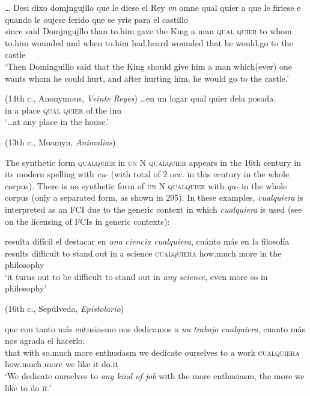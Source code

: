 \ea \label{ex:key:294}
\ea \label{ex:key:294-1} 
\gll … Desi dixo domjngujllo que le diese el Rey \textit{vn} {omne} {qual} {quier} a que le firiese e quando le oujese ferido que se yrie para el castillo\\
{} since said Domjngujllo than to.him gave the King a man \textsc{qual} \textsc{quier} to whom to.him wounded and when to.him had.heard wounded that he would.go to the castle\\
    \glt ‘Then Dominguillo said that the King should give him a man which(ever) one wants whom he could hurt, and after hurting him, he would go to the castle.’

    (14th c., Anonymous, \textit{Veinte Reyes})
\ex \label{ex:key:294-2} 
\gll …en un logar qual quier dela posada.\\
in a place \textsc{qual} \textsc{quier} of.the inn\\
    \glt ‘…at any place in the house.’

    (13th c., Moamyn, \textit{Animalias})
\z
\z

\largerpage
The synthetic form \textsc{qualquier} in \textsc{un} N \textsc{qualquier} appears in the 16th century in its modern spelling with \textit{cu}{}- (with total of 2 occ. in this century in the whole corpus). There is no synthetic form of \textsc{un} N \textsc{qualquier} with \textit{qu-} in the whole corpus (only a separated form, as shown in 295). In these examples, \textit{cualquiera} is interpreted as an FCI due to the generic context in which \textit{cualquiera} is used (see  on the licensing of FCIs in generic contexts):

\ea \label{ex:key:295} %
  \gll resulta difícil el destacar en \textit{una} \textit{ciencia} \textit{cualquiera}, cuánto más en la filosofía\\
results difficult to stand.out in a science \textsc{cualquiera} how.much more in the philosophy\\
  \glt ‘it turns out to be difficult to stand out in \textit{any science}, even more so in philosophy’

  (16th c., Sepúlveda, \textit{Epistolario})
\z 

\ea \label{ex:key:296} %
  \gll que con tanto más entusiasmo nos dedicamos a \textit{un} \textit{trabajo} \textit{cualquiera}, cuanto más nos agrada el hacerlo.\\
that with so.much more enthusiasm we {dedicate ourselves} to a work \textsc{cualquiera} how.much more we like it do.it\\
  \glt ‘We dedicate ourselves to \textit{any kind of job} with the more enthusiasm, the more we like to do it.’

